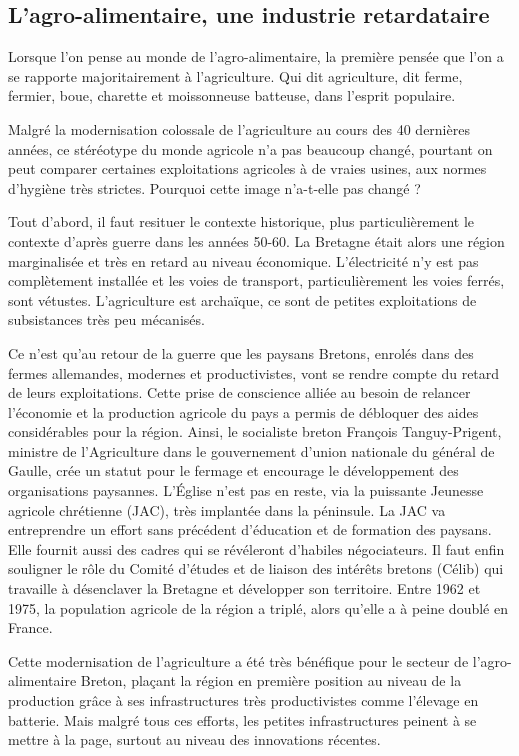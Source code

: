 \documentclass[a4paper,10pt]{report}
\begin{document}
		\subsection{L'agro-alimentaire, une industrie retardataire}
			Lorsque l’on pense au monde de l’agro-alimentaire, la première pensée que l’on a se rapporte majoritairement à l’agriculture. Qui dit agriculture, dit ferme, fermier, boue, charette et moissonneuse batteuse, dans l’esprit populaire.
			
			Malgré la modernisation colossale de l’agriculture au cours des 40 dernières années, ce stéréotype du monde agricole n’a pas beaucoup changé, pourtant on peut comparer certaines exploitations agricoles à de vraies usines, aux normes d’hygiène très strictes. Pourquoi cette image n’a-t-elle pas changé ?
			
			Tout d’abord, il faut resituer le contexte historique, plus particulièrement le contexte d’après guerre dans les années 50-60. La Bretagne était alors une région marginalisée et très en retard au niveau économique. L’électricité n’y est pas complètement installée et les voies de transport, particulièrement les voies ferrés, sont vétustes. L’agriculture est archaïque, ce sont de petites exploitations de subsistances très peu mécanisés.
			
			Ce n’est qu’au retour de la guerre que les paysans Bretons, enrolés dans des fermes allemandes, modernes et productivistes, vont se rendre compte du retard de leurs exploitations. Cette prise de conscience alliée au besoin de relancer l’économie et la production agricole du pays a permis de débloquer des aides considérables pour la région. Ainsi, le socialiste breton François Tanguy-Prigent, ministre de l'Agriculture dans le gouvernement d'union nationale du général de Gaulle, crée un statut pour le fermage et encourage le développement des organisations paysannes. L'Église n'est pas en reste, via la puissante Jeunesse agricole chrétienne (JAC), très implantée dans la péninsule. La JAC va entreprendre un effort sans précédent d'éducation et de formation des paysans. Elle fournit aussi des cadres qui se révéleront d'habiles négociateurs. Il faut enfin souligner le rôle du Comité d'études et de liaison des intérêts bretons (Célib) qui travaille à désenclaver la Bretagne et développer son territoire\cite{ModernisationAgricultureBretonne}. Entre 1962 et 1975, la population agricole de la région a triplé, alors qu’elle a à peine doublé en France.
			
			Cette modernisation de l’agriculture a été très bénéfique pour le secteur de l’agro-alimentaire Breton, plaçant la région en première position au niveau de la production grâce à ses infrastructures très productivistes comme l’élevage en batterie. Mais malgré tous ces efforts, les petites infrastructures peinent à se mettre à la page, surtout au niveau des innovations récentes. 
			
\end{document}
